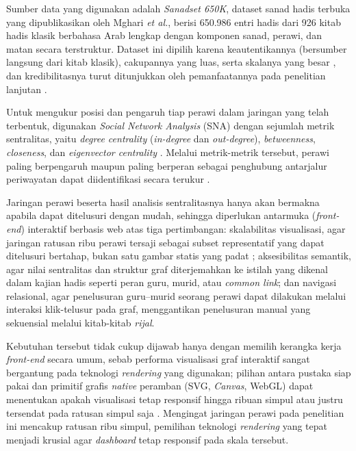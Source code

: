 Sumber data yang digunakan adalah \textit{Sanadset 650K}, dataset sanad hadis terbuka yang dipublikasikan oleh Mghari \textit{et al.}, berisi 650.986 entri hadis dari 926 kitab hadis klasik berbahasa Arab lengkap dengan komponen sanad, perawi, dan matan secara terstruktur. Dataset ini dipilih karena keautentikannya (bersumber langsung dari kitab klasik), cakupannya yang luas, serta skalanya yang besar \cite{MGHARI2022108540}, dan kredibilitasnya turut ditunjukkan oleh pemanfaatannya pada penelitian lanjutan \cite{Mghari2024Narrator2Vec}.

Untuk mengukur posisi dan pengaruh tiap perawi dalam jaringan yang telah terbentuk, digunakan \textit{Social Network Analysis} (SNA) dengan sejumlah metrik sentralitas, yaitu \textit{degree centrality} (\textit{in-degree} dan \textit{out-degree}), \textit{betweenness}, \textit{closeness}, dan \textit{eigenvector centrality} \cite{LópezWerner04072025}. Melalui metrik-metrik tersebut, perawi paling berpengaruh maupun paling berperan sebagai penghubung antarjalur periwayatan dapat diidentifikasi secara terukur \cite{FAROOQI2024110439}.

Jaringan perawi beserta hasil analisis sentralitasnya hanya akan bermakna apabila dapat ditelusuri dengan mudah, sehingga diperlukan antarmuka (\textit{front-end}) interaktif berbasis web atas tiga pertimbangan: skalabilitas visualisasi, agar jaringan ratusan ribu perawi tersaji sebagai subset representatif yang dapat ditelusuri bertahap, bukan satu gambar statis yang padat \cite{LópezWerner04072025}; aksesibilitas semantik, agar nilai sentralitas dan struktur graf diterjemahkan ke istilah yang dikenal dalam kajian hadis seperti peran guru, murid, atau \textit{common link}; dan navigasi relasional, agar penelusuran guru--murid seorang perawi dapat dilakukan melalui interaksi klik-telusur pada graf, menggantikan penelusuran manual yang sekuensial melalui kitab-kitab \textit{rijal}.

Kebutuhan tersebut tidak cukup dijawab hanya dengan memilih kerangka kerja \textit{front-end} secara umum, sebab performa visualisasi graf interaktif sangat bergantung pada teknologi \textit{rendering} yang digunakan; pilihan antara pustaka siap pakai dan primitif grafis \textit{native} peramban (SVG, \textit{Canvas}, WebGL) dapat menentukan apakah visualisasi tetap responsif hingga ribuan simpul atau justru tersendat pada ratusan simpul saja \cite{Zhao2025}. Mengingat jaringan perawi pada penelitian ini mencakup ratusan ribu simpul, pemilihan teknologi \textit{rendering} yang tepat menjadi krusial agar \textit{dashboard} tetap responsif pada skala tersebut.

